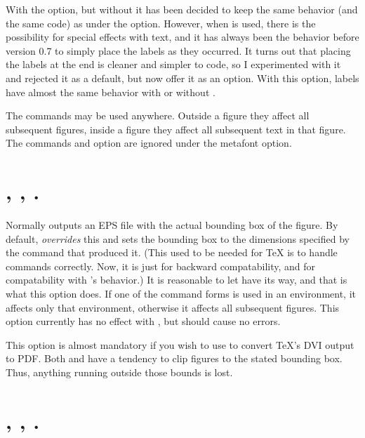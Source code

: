 \documentclass[letterpaper]{article}
\begin{document}
With the  option, but without  it has been
decided to keep the same behavior (and the same code) as under the
 option. However, when  is used, there is
the possibility for special effects with text, and it has always been
the behavior before version 0.7 to simply place the labels as they
occurred. It turns out that placing the labels at the end is cleaner and
simpler to code, so I experimented with it and rejected it as a default,
but now offer it as an option. With this option, \mfp{} labels have
almost the same behavior with or without .

The commands may be used anywhere. Outside a figure they affect all
subsequent figures, inside a figure they affect all subsequent text in
that figure. The commands and option are ignored under the metafont
option.

\section{, ,
.}\label{truebbox}
%
%

Normally \MP{} outputs an EPS file with the actual bounding box of the
figure. By default, \mfp{} \emph{overrides} this and sets the bounding
box to the dimensions specified by the  command that produced
it. (This used to be needed for \TeX{} is to handle  commands
correctly. Now, it is just for backward compatability, and for
compatability with \MF{}'s behavior.) It is reasonable to let \MP{} have
its way, and that is what this option does. If one of the command forms
is used in an  environment, it affects only that environment,
otherwise it affects all subsequent figures. This option currently has
no effect with \MF{}, but should cause no errors.

This option is almost mandatory if you wish to use  to
convert \TeX{}'s DVI output to PDF. Both  and
 have a tendency to clip \MP{} figures to the stated
bounding box. Thus, anything running outside those bounds is lost.


\section{, , .}\label{clip}
%
%
\end{document}
